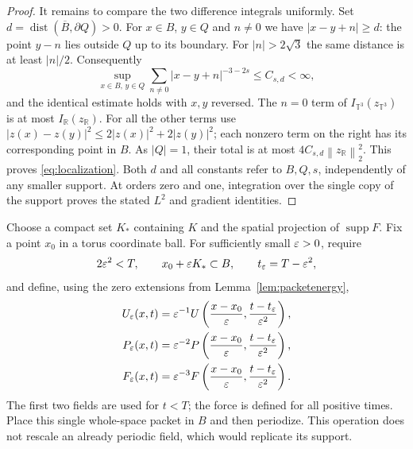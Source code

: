 \documentclass[11pt,a4paper]{article}
\theoremstyle{definition}\newtheorem{definition}[theorem]{Definition}
\theoremstyle{remark}\newtheorem{remark}[theorem]{Remark}
\newcommand{\R}{\mathbb R}\newcommand{\TT}{\mathbb T^3}
\newcommand{\norm}[1]{\left\lVert#1\right\rVert}
\DeclareMathOperator{\supp}{supp}
\begin{document}
\begin{proof}
It remains to compare the two difference integrals uniformly. Set
$d=\operatorname{dist}(\overline B,\partial Q)>0$.
For $x\in B$, $y\in Q$ and $n\ne0$ we have
$|x-y+n|\ge d$: the point $y-n$ lies outside $Q$ up to its boundary.
For $|n|>2\sqrt3$ the same distance is at least $|n|/2$.
Consequently
\[
 \sup_{x\in B,\,y\in Q}
 \sum_{n\ne0}|x-y+n|^{-3-2s}\le C_{s,d}<\infty,
\]
and the identical estimate holds with $x,y$ reversed. The $n=0$ term of
$I_{\TT}(z_{\TT})$ is at most $I_{\R}(z_{\R})$.
For all the other terms use
$|z(x)-z(y)|^2\le2|z(x)|^2+2|z(y)|^2$; each nonzero term on the right has
its corresponding point in $B$. As $|Q|=1$, their total is at most
$4C_{s,d}\norm{z_{\R}}_2^2$.
This proves \eqref{eq:localization}. Both $d$ and all constants refer to
$B,Q,s$, independently of any smaller support. At orders zero and one,
integration over the single copy of the support proves the stated $L^2$
and gradient identities.
\end{proof}

Choose a compact set $K_*$ containing $K$ and the spatial projection of $\supp F$. Fix a point $x_0$ in a torus coordinate ball. For sufficiently small $\varepsilon>0$, require
\[
 2\varepsilon^2<T,\qquad x_0+\varepsilon K_*\subset B,
 \qquad t_\varepsilon=T-\varepsilon^2,
\]
and define, using the zero extensions from Lemma~\ref{lem:packetenergy},
\begin{align}
 U_\varepsilon(x,t)&=\varepsilon^{-1}U\left(\frac{x-x_0}{\varepsilon},
                              \frac{t-t_\varepsilon}{\varepsilon^2}\right),\nonumber\\
 P_\varepsilon(x,t)&=\varepsilon^{-2}P\left(\frac{x-x_0}{\varepsilon},
                              \frac{t-t_\varepsilon}{\varepsilon^2}\right),\label{eq:scaling}\\
 F_\varepsilon(x,t)&=\varepsilon^{-3}F\left(\frac{x-x_0}{\varepsilon},
                              \frac{t-t_\varepsilon}{\varepsilon^2}\right).\nonumber
\end{align}
The first two fields are used for $t<T$; the force is defined for all positive times. Place this single whole-space packet in $B$ and then periodize. This operation does not rescale an already periodic field, which would replicate its support.
\end{document}

